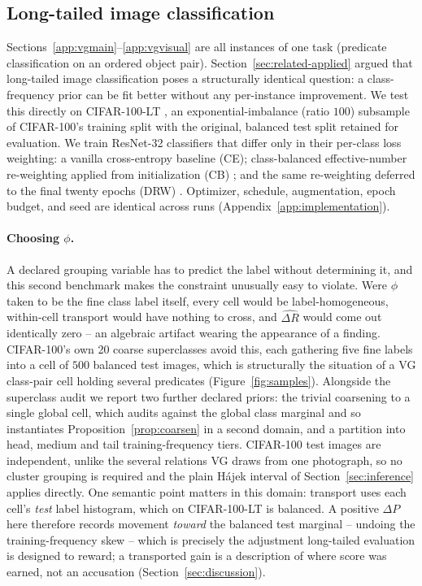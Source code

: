 \subsection{Long-tailed image classification}\label{app:lt}\label{sec:cifarlt}

Sections~\ref{app:vgmain}--\ref{app:vgvisual} are all instances of one task (predicate
classification on an ordered object pair). Section~\ref{sec:related-applied} argued
that long-tailed image classification poses a structurally identical question: a
class-frequency prior can be fit better without any per-instance improvement. We test
this directly on CIFAR-100-LT \citep{cui2019classbalanced}, an exponential-imbalance
(ratio $100$) subsample of CIFAR-100's training split with the original, balanced test
split retained for evaluation. We train ResNet-32 \citep{he2016deep} classifiers that
differ only in their per-class loss weighting: a vanilla cross-entropy baseline (CE);
class-balanced effective-number re-weighting applied from initialization (CB)
\citep{cui2019classbalanced}; and the same re-weighting deferred to the final twenty
epochs (DRW) \citep{cao2019learning}. Optimizer, schedule, augmentation, epoch budget,
and seed are identical across runs (Appendix~\ref{app:implementation}).

\paragraph{Choosing $\phi$.} A declared grouping variable has to predict the label without
determining it, and this second benchmark makes the constraint unusually easy to
violate. Were $\phi$ taken to be the fine class label itself, every cell would be
label-homogeneous, within-cell transport would have nothing to cross, and
$\widehat{\Delta R}$ would come out identically zero -- an algebraic artifact wearing the
appearance of a finding. CIFAR-100's own 20 coarse superclasses avoid this, each
gathering five fine labels into a cell of $500$ balanced test images, which is
structurally the situation of a VG class-pair cell holding several predicates
(Figure~\ref{fig:samples}). Alongside the superclass audit we report two further
declared priors: the trivial coarsening to a single global cell, which audits against
the global class marginal and so instantiates Proposition~\ref{prop:coarsen} in a second
domain, and a partition into head, medium and tail training-frequency tiers. CIFAR-100
test images are independent, unlike the several relations VG draws from one photograph,
so no cluster grouping is required and the plain H\'ajek interval of
Section~\ref{sec:inference} applies directly. One semantic point matters in this domain:
transport uses each cell's \emph{test} label histogram, which on CIFAR-100-LT is
balanced. A positive $\Delta P$ here therefore records movement \emph{toward} the
balanced test marginal -- undoing the training-frequency skew -- which is precisely the
adjustment long-tailed evaluation is designed to reward; a transported gain is a
description of where score was earned, not an accusation
(Section~\ref{sec:discussion}).


